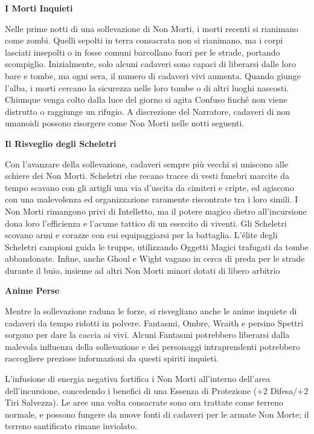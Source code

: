 \documentclass[a4paper,11pt,twoside,openany]{book}
\begin{document}
{\textbf{I Morti Inquieti}

Nelle prime notti di una sollevazione di Non Morti, i morti recenti si rianimano come zombi. Quelli sepolti in terra consacrata non si rianimano, ma i corpi lasciati insepolti o in fosse comuni barcollano fuori per le strade, portando scompiglio. Inizialmente, solo alcuni cadaveri sono capaci di liberarsi dal­le loro bare e tombe, ma ogni sera, il numero di cadaveri vivi aumenta. Quando giunge l'alba, i morti cercano la sicurezza nelle loro tombe o di altri luoghi nascosti. Chiunque venga colto dalla luce del giorno si agita Confuso finché non viene distrutto o raggiunge un rifugio. A discrezione del Narratore, cadaveri di non umanoidi possono risorgere come Non Morti nelle notti seguenti.

\textbf{Il Risveglio degli Scheletri}

Con l'avanzare della sollevazione, cadaveri sempre più vecchi si uniscono alle schiere dei Non Morti. Scheletri che recano tracce di vesti funebri marcite da tempo scavano con gli artigli una via d'uscita da cimiteri e cripte, ed agiscono con una malevolenza ed organizzazione raramente riscontrate tra i loro simili. I Non Morti rimangono privi di Intelletto, ma il potere magico dietro all'incursione dona loro l'efficienza e l'acume tattico di un esercito di viventi. Gli Scheletri scovano armi e corazze con cui equipaggiarsi per la battaglia. L'élite degli Scheletri campioni guida le truppe, utilizzando Oggetti Magici trafugati da tombe abbandonate. Infine, anche Ghoul e Wight vagano in cerca di preda per le strade durante il buio, insieme ad altri Non Morti minori dotati di libero arbitrio

\textbf{Anime Perse}

Mentre la sollevazione raduna le forze, si risvegliano anche le anime inquiete di cadaveri da tempo ridotti in polvere. Fantasmi, Ombre, Wraith e persino Spettri sorgono per dare la caccia ai vivi. Alcuni Fantasmi potrebbero liberarsi dalla malevola influenza della sollevazione e dei personaggi intraprendenti potrebbero raccogliere preziose informazioni da questi spiriti inquieti.

L'infusione di energia negativa fortifica i Non Morti all'interno dell'area dell'incursione, concedendo i benefici di una Essenza di Protezione (+2 Difesa/+2 Tiri Salvezza). Le aree una volta consacrate sono ora trattate come terreno normale, e possono fungere da nuove fonti di cadaveri per le armate Non Morte; il terreno santificato rimane inviolato.

}
\end{document}
